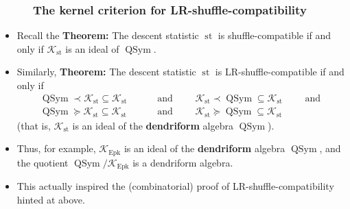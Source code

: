 \documentclass{beamer}
\newcommand{\Epk}{\operatorname{Epk}}
\newcommand{\st}{\operatorname{st}}
\newcommand{\QSym}{\operatorname{QSym}}
\newcommand{\calK}{\mathcal{K}}
\newcommand{\fti}[1]{\frametitle{\ \ \ \ \ #1}}
\theoremstyle{plain}
\begin{document}
\begin{frame}
\fti{The kernel criterion for LR-shuffle-compatibility}

\begin{itemize}

\item Recall the \textbf{Theorem:} The descent statistic $\st$ is
      shuffle-compatible if and only if $\calK_{\st}$ is an
      ideal of $\QSym$.

\pause
\item Similarly, \textbf{Theorem:} The descent statistic $\st$ is
      LR-shuffle-compatible if and only if %
      \begin{align*}
      \QSym \prec \calK_{\st}
      \subseteq \calK_{\st} \qquad &\text{ and } \qquad \calK_{\st} \prec \QSym
      \subseteq \calK_{\st} \qquad \text{ and } \\
      \QSym \succeq \calK_{\st}
      \subseteq \calK_{\st} \qquad &\text{ and } \qquad \calK_{\st} \succeq \QSym
      \subseteq \calK_{\st}
      \end{align*}
      (that is, $\calK_{\st}$ is an ideal of the \textbf{dendriform}
      algebra $\QSym$).

\pause

\item Thus, for example, $\mathcal{K}_{\Epk}$ is an ideal of the \textbf{dendriform}
      algebra $\QSym$, and the quotient
      $\QSym / \mathcal{K}_{\Epk}$ is a dendriform algebra.
\pause

\item This actually inspired the (combinatorial) proof of
      LR-shuffle-compatibility hinted at above.

\end{itemize}

\vspace{10cm}

\end{frame}
\end{document}
